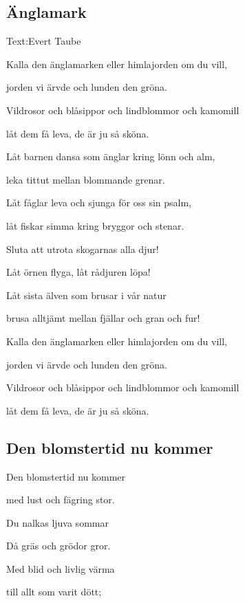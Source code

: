 

\pagestyle{Sommarvisor}



\subsection{\textbf{Änglamark}}

Text:Evert Taube\bigskip


Kalla den änglamarken eller himlajorden om du vill,

jorden vi ärvde och lunden den gröna.

Vildrosor och blåsippor och lindblommor och kamomill

låt dem få leva, de är ju så sköna.\bigskip


Låt barnen dansa som änglar kring lönn och alm,

leka tittut mellan blommande grenar.

Låt fåglar leva och sjunga för oss sin psalm,

låt fiskar simma kring bryggor och stenar.

Sluta att utrota skogarnas alla djur!

Låt örnen flyga, låt rådjuren löpa!

Låt sista älven som brusar i vår natur

brusa alltjämt mellan fjällar och gran och fur!\bigskip


Kalla den änglamarken eller himlajorden om du vill,

jorden vi ärvde och lunden den gröna.

Vildrosor och blåsippor och lindblommor och kamomill

låt dem få leva, de är ju så sköna. 

\subsection{\textbf{Den blomstertid nu kommer}}


Den blomstertid nu kommer

med lust och fägring stor.

Du nalkas ljuva sommar

Då gräs och grödor gror.

Med blid och livlig värma

till allt som varit dött;


